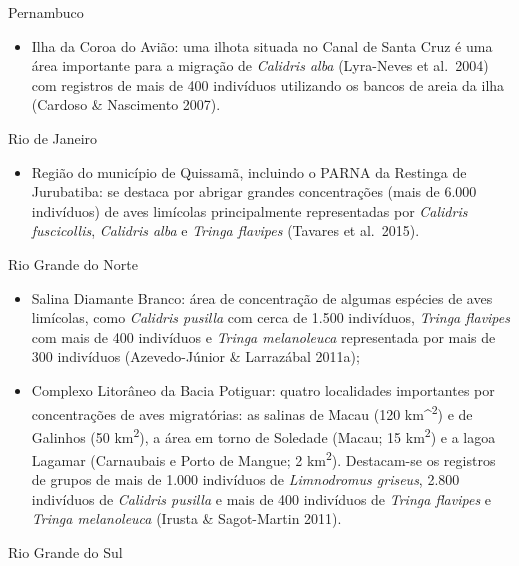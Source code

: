 \documentclass[
]{scrbook}
\providecommand{\tightlist}{%
  \setlength{\itemsep}{0pt}\setlength{\parskip}{0pt}}
\begin{document}
Pernambuco

\begin{itemize}
\tightlist
\item
  Ilha da Coroa do Avião: uma ilhota situada no Canal de Santa Cruz é uma área importante para a migração de \emph{Calidris alba} (Lyra-Neves et al.~2004) com registros de mais de 400 indivíduos utilizando os bancos de areia da ilha (Cardoso \& Nascimento 2007).
\end{itemize}

Rio de Janeiro

\begin{itemize}
\tightlist
\item
  Região do município de Quissamã, incluindo o PARNA da Restinga de Jurubatiba: se destaca por abrigar grandes concentrações (mais de 6.000 indivíduos) de aves limícolas principalmente representadas por \emph{Calidris fuscicollis}, \emph{Calidris alba} e \emph{Tringa flavipes} (Tavares et al.~2015).
\end{itemize}

Rio Grande do Norte

\begin{itemize}
\item
  Salina Diamante Branco: área de concentração de algumas espécies de aves limícolas, como \emph{Calidris pusilla} com cerca de 1.500 indivíduos, \emph{Tringa flavipes} com mais de 400 indivíduos e \emph{Tringa melanoleuca} representada por mais de 300 indivíduos (Azevedo-Júnior \& Larrazábal 2011a);
\item
  Complexo Litorâneo da Bacia Potiguar: quatro localidades importantes por concentrações de aves migratórias: as salinas de Macau (120 km\^{}\textsuperscript{2}) e de Galinhos (50 km\textsuperscript{2}), a área em torno de Soledade (Macau; 15 km\textsuperscript{2}) e a lagoa Lagamar (Carnaubais e Porto de Mangue; 2 km\textsuperscript{2}). Destacam-se os registros de grupos de mais de 1.000 indivíduos de \emph{Limnodromus griseus}, 2.800 indivíduos de \emph{Calidris pusilla} e mais de 400 indivíduos de \emph{Tringa flavipes} e \emph{Tringa melanoleuca} (Irusta \& Sagot-Martin 2011).
\end{itemize}

Rio Grande do Sul
\end{document}
